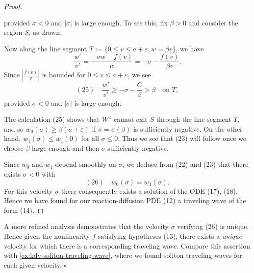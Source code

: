 \begin{proof}
\begin{figure}[h]\centering
\end{figure}

\begin{figure}[h]\centering
\end{figure}

provided $\sigma<0$ and $|\sigma|$ is large enough. To see this, fix $\beta>0$ and consider the region $S$, as drawn.

Now along the line segment $T := \{0\le v \le a+\varepsilon, w=\beta v\}$, we have
$$\frac{w'}{v'} = \frac{-\sigma w - f(v)}{w} = -\sigma - \frac{f(v)}{\beta v}.$$
Since $\left|\frac{f(v)}{v}\right|$ is bounded for $0 \le v \le a + \varepsilon$, we see
$$(25) \quad \frac{w'}{v'} \ge -\sigma - \frac{C}{\beta} > \beta \quad \text{on } T,$$
provided $\sigma < 0$ and $|\sigma|$ is large enough.

The calculation (25) shows that $W^u$ cannot exit $S$ through the line segment $T$, and so $w_0(\sigma) \ge \beta(a + \varepsilon)$ if $\sigma = \sigma(\beta)$ is sufficiently negative. On the other hand, $w_1(\sigma) \le w_1(0)$ for all $\sigma \le 0$. Thus we see that (23) will follow once we choose $\beta$ large enough and then $\sigma$ sufficiently negative.

Since $w_0$ and $w_1$ depend smoothly on $\sigma$, we deduce from (22) and (23) that there exists $\sigma < 0$ with
$$(26) \quad w_0(\sigma) = w_1(\sigma).$$
For this velocity $\sigma$ there consequently exists a solution of the ODE (17), (18). Hence we have found for our reaction-diffusion PDE (12) a traveling wave of the form (14).
\end{proof}

\begin{remark}
\label{rem:bistable-traveling-wave-velocity-uniqueness}
A more refined analysis demonstrates that the velocity $\sigma$ verifying (26) is unique. Hence given the nonlinearity $f$ satisfying hypotheses (13), there exists a \textit{unique} velocity for which there is a corresponding traveling wave. Compare this assertion with \cref{ex:kdv-soliton-traveling-wave}, where we found soliton traveling waves for each given velocity. $\square$
\end{remark}

